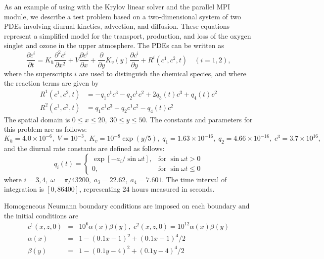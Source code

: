 As an example of using {\cvodes} with the Krylov linear solver {\cvspgmr}
and the parallel MPI {\nvecp} module, we describe 
a test problem based on a two-dimensional system of two PDEs involving
diurnal kinetics, advection, and diffusion. 
These equations represent a simplified model for the transport, production,
and loss of the oxygen singlet and ozone in the upper atmosphere.
The PDEs can be written as 
\begin{equation}\label{e:pvkx:pde}
  \frac{\partial c^i}{\partial t}=K_h\frac{\partial^2 c^i}{\partial x^2}
  +V \frac{\partial c^i}{\partial x}
  + \frac{\partial} {\partial y} K_v(y) \frac{\partial c^i}{\partial y}
  + R^i(c^1,c^2,t) \quad (i=1,2),
\end{equation}
where the superscripts $i$ are used to distinguish the chemical species, and
where the reaction terms are given by 
\begin{equation}\label{e:pvkx:r}
\begin{split}
  R^1(c^1,c^2,t) & = -q_1c^1c^3-q_2c^1c^2+2q_3(t)c^3+q_4(t)c^2 \\
  R^2(c^1,c^2,t) & = q_1c^1c^3-q_2c^1c^2-q_4(t)c^2
\end{split}
\end{equation}
The spatial domain is $0 \leq x \leq 20,\;30 \leq y \leq 50$. The constants
and parameters for this problem are as follows: $K_h=4.0\times
10^{-6},\;V=10^{-3},\;K_v=10^{-8}\exp (y/5),\;q_1=1.63\times
10^{-16},\;q_2=4.66\times 10^{-16},\;c^3=3.7\times 10^{16},$ and the diurnal
rate constants are defined as follows: 
\begin{equation*}
q_i(t) = 
\begin{cases}
\exp [-a_i/\sin \omega t], & \mbox{for }\sin \omega t>0 \\
0, & \mbox{for }\sin \omega t\leq 0
\end{cases}
\end{equation*}
where $i=3,4,\;\omega =\pi /43200,\;a_3=22.62,\;a_4=7.601.$
The time interval of integration is $[0, 86400]$, representing 24
hours measured in seconds.

Homogeneous Neumann boundary conditions are imposed on each boundary and the
initial conditions are 
\begin{eqnarray*}
c^{1}(x,z,0) &=&10^{6}\alpha (x)\beta (y),\;c^{2}(x,z,0)=10^{12}\alpha
(x)\beta (y) \\
\alpha (x) &=&1-(0.1x-1)^{2}+(0.1x-1)^{4}/2 \\
\beta (y) &=&1-(0.1y-4)^{2}+(0.1y-4)^{4}/2
\end{eqnarray*}

